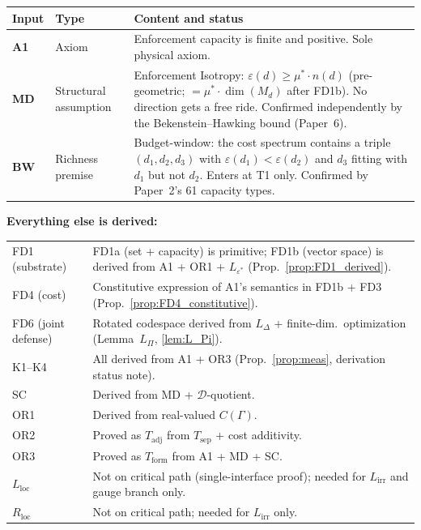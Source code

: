 \documentclass[11pt]{article}
\theoremstyle{remark}
\begin{document}
\medskip
\begin{center}
\smallskip
\begin{tabular}{@{}p{2.0cm}p{1.8cm}p{8.0cm}@{}}
\textbf{Input} & \textbf{Type} & \textbf{Content and status} \\[2pt]
\hline\noalign{\smallskip}
\textbf{A1} & Axiom & Enforcement capacity is finite and positive.  Sole physical axiom.  \\[4pt]
\textbf{MD} & Structural assumption & Enforcement Isotropy: $\varepsilon(d) \ge \mu^* \cdot n(d)$ (pre-geometric; $= \mu^* \cdot \dim(M_d)$ after FD1b).  No direction gets a free ride.  Confirmed independently by the Bekenstein--Hawking bound (Paper~6). \\[4pt]
\textbf{BW} & Richness premise & Budget-window: the cost spectrum contains a triple $(d_1, d_2, d_3)$ with $\varepsilon(d_1) < \varepsilon(d_2)$ and $d_3$ fitting with $d_1$ but not $d_2$.  Enters at T1 only.  Confirmed by Paper~2's 61 capacity types.\\
\end{tabular}
\label{tab:critical_path}
\end{center}

\medskip\noindent\textbf{Everything else is derived:}

\smallskip
\begin{center}
\smallskip
\begin{tabular}{@{}p{2.2cm}p{9.5cm}@{}}
FD1 (substrate) & FD1a (set + capacity) is primitive; FD1b (vector space) is derived from A1 + OR1 + $L_{\varepsilon^*}$ (Prop.~\ref{prop:FD1_derived}). \\[2pt]
FD4 (cost) & Constitutive expression of A1's semantics in FD1b + FD3 (Prop.~\ref{prop:FD4_constitutive}). \\[2pt]
FD6 (joint defense) & Rotated codespace derived from $L_\Delta$ + finite-dim.\ optimization (Lemma~$L_\Pi$, \ref{lem:L_Pi}). \\[2pt]
K1--K4 & All derived from A1 + OR3 (Prop.~\ref{prop:meas}, derivation status note). \\[2pt]
SC & Derived from MD + $\mathcal{D}$-quotient. \\[2pt]
OR1 & Derived from real-valued $C(\Gamma)$. \\[2pt]
OR2 & Proved as $T_{\mathrm{adj}}$ from $T_{\mathrm{sep}}$ + cost additivity. \\[2pt]
OR3 & Proved as $T_{\mathrm{form}}$ from A1 + MD + SC. \\[2pt]
$L_{\mathrm{loc}}$ & Not on critical path (single-interface proof); needed for $L_{\mathrm{irr}}$ and gauge branch only. \\[2pt]
$R_{\mathrm{loc}}$ & Not on critical path; needed for $L_{\mathrm{irr}}$ only. \\
\end{tabular}
\label{tab:derived_items}
\end{center}
\end{document}
